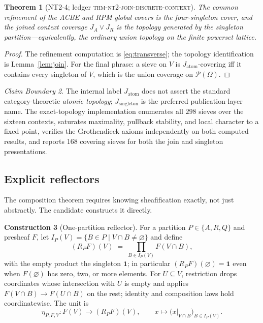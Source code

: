 \documentclass[11pt]{amsart}
\newtheorem{theorem}{Theorem}[section]
\theoremstyle{definition}
\newtheorem{construction}[theorem]{Construction}
\theoremstyle{remark}
\newtheorem{boundary}[theorem]{Claim Boundary}
\begin{document}
\begin{theorem}[NT2-4; \textnormal{ledger \textsc{thm-nt2-join-discrete-context}}]\label{thm:nt2-4}
The common refinement of the ACBE and RPM global covers is the four-singleton cover, and the joined context coverage $J_A\vee J_R$ is the topology generated by the singleton partition---equivalently, the ordinary union topology on the finite powerset lattice.
\end{theorem}

\begin{proof}
The refinement computation is \eqref{eq:transverse}; the topology identification is Lemma~\ref{lem:join}. For the final phrase: a sieve on $V$ is $J_{\mathrm{atom}}$-covering iff it contains every singleton of $V$, which is the union coverage on $\mathcal{P}(\Omega)$.
\end{proof}

\begin{boundary}
The internal label $J_{\mathrm{atom}}$ does not assert the standard category-theoretic \emph{atomic topology}; $J_{\mathrm{singleton}}$ is the preferred publication-layer name. The exact-topology implementation enumerates all $298$ sieves over the sixteen contexts, saturates maximality, pullback stability, and local character to a fixed point, verifies the Grothendieck axioms independently on both computed results, and reports $168$ covering sieves for both the join and singleton presentations.
\end{boundary}

\subsection{Explicit reflectors}

The composition theorem requires knowing sheafification exactly, not just abstractly. The candidate constructs it directly.

\begin{construction}[One-partition reflector]\label{con:reflector}
For a partition $P\in\{A,R,Q\}$ and presheaf $F$, let $I_P(V)=\{B\in P \mid V\cap B\neq\varnothing\}$ and define
\begin{equation}\label{eq:reflector}
(R_PF)(V) \;=\; \prod_{B\in I_P(V)} F(V\cap B),
\end{equation}
with the empty product the singleton $\mathbf{1}$; in particular $(R_PF)(\varnothing)=\mathbf{1}$ even when $F(\varnothing)$ has zero, two, or more elements. For $U\subseteq V$, restriction drops coordinates whose intersection with $U$ is empty and applies $F(V\cap B)\to F(U\cap B)$ on the rest; identity and composition laws hold coordinatewise. The unit is
\begin{equation}\label{eq:unit}
\eta_{P,F,V}:F(V)\to (R_PF)(V),\qquad x\mapsto\bigl(x|_{V\cap B}\bigr)_{B\in I_P(V)} .
\end{equation}
\end{construction}
\end{document}
